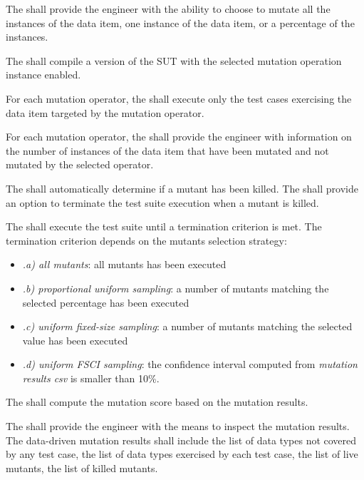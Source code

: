 \RQ{} The \FAQAS shall provide the engineer with the ability to choose to mutate all the instances of the data item, one instance of the data item, or a percentage of the instances.

\RQ{} The \FAQAS shall compile a version of the SUT with the selected mutation operation instance enabled.

\RQ{} For each mutation operator, the \FAQAS shall execute only the test cases exercising the data item targeted by the mutation operator.

\RQ{} For each mutation operator, the \FAQAS shall provide the engineer with information on the number of instances of the data item that have been mutated and not mutated by the selected operator.

\RQ{} The \FAQAS shall automatically determine if a mutant has been killed. The \FAQAS shall provide an option to terminate the test suite execution when a mutant is killed.

\RQ{} The \FAQAS shall execute the test suite until a termination criterion is met. The termination criterion depends on the mutants selection strategy:
\begin{itemize}
\item \emph{.a) all mutants}: all mutants has been executed
\item \emph{.b) proportional uniform sampling}: a number of mutants matching the selected percentage has been executed
\item \emph{.c) uniform fixed-size sampling}: a number of mutants matching the selected value has been executed
\item \emph{.d) uniform FSCI sampling}: the confidence interval computed from \emph{mutation results csv} is smaller than 10\%.
\end{itemize}


\RQ{} The \FAQAS shall compute the mutation score based on the mutation results.

\RQ{} The \FAQAS shall provide the engineer with the means to inspect the mutation results. The \FAQAS data-driven mutation results shall include the list of data types not covered by any test case, the list of data types exercised by each test case, the list of live mutants, the list of killed mutants.



